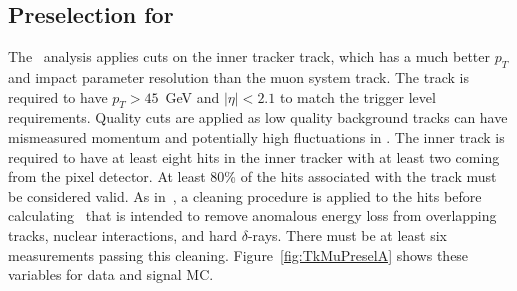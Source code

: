 \subsection{Preselection for \tktof\ \label{sec:tktofpreselection}}

The \tktof\ analysis applies cuts on the inner tracker track, which has a much better $p_T$ and impact parameter resolution than the muon system track.
The track is required to have $p_T > 45$~GeV and  $|\eta| < 2.1$ to match the trigger level requirements. 
Quality cuts are applied as low quality background tracks can have mismeasured momentum and potentially high fluctuations in \dedx.
The inner track is required to have at least eight hits in the inner tracker with at least two coming from the pixel detector. At least 80\% of the hits associated with the track
must be considered valid. As in~\cite{Chatrchyan:2012sp}, a cleaning procedure is applied to the hits before calculating \dedx\ that is 
intended to remove anomalous energy loss from overlapping tracks, nuclear interactions, and hard $\delta$-rays.
There must be at least six measurements passing this cleaning.
Figure~\ref{fig:TkMuPreselA} shows these variables for data and signal MC.


